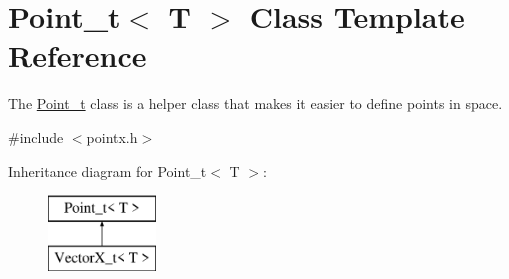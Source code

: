 \hypertarget{class_point__t}{}\section{Point\+\_\+t$<$ T $>$ Class Template Reference}
\label{class_point__t}


The \hyperlink{class_point__t}{Point\+\_\+t} class is a helper class that makes it easier to define points in space.  




{\ttfamily \#include $<$pointx.\+h$>$}

Inheritance diagram for Point\+\_\+t$<$ T $>$\+:\begin{figure}[H]
\begin{center}
\leavevmode
\includegraphics[height=2.000000cm]{class_point__t}
\end{center}
\end{figure}
